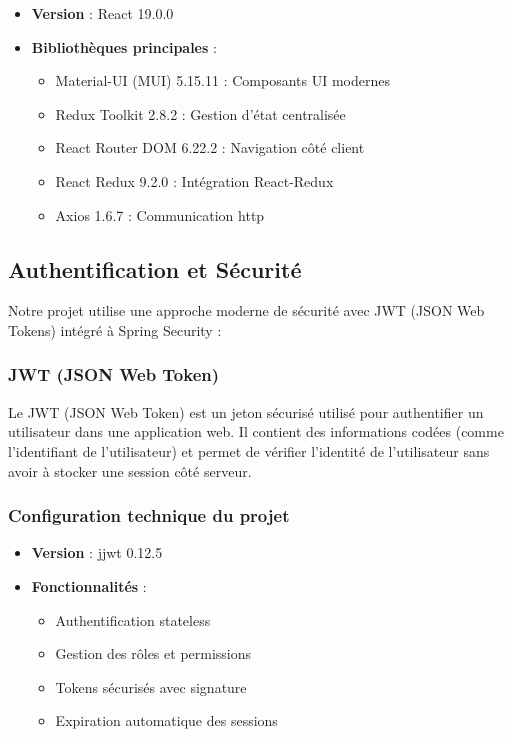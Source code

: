\documentclass[12pt,a4paper]{report}
\begin{document}
\begin{itemize}
\item \textbf{Version} : React 19.0.0
\item \textbf{Bibliothèques principales} :
  \begin{itemize}
  \item Material-UI (MUI) 5.15.11 : Composants UI modernes
  \item Redux Toolkit 2.8.2 : Gestion d'état centralisée
  \item React Router DOM 6.22.2 : Navigation côté client
  \item React Redux 9.2.0 : Intégration React-Redux
  \item Axios 1.6.7 : Communication http
  \end{itemize}
\end{itemize}

\subsection{Authentification et Sécurité}

Notre projet utilise une approche moderne de sécurité avec JWT (JSON Web Tokens) intégré à Spring Security :

\subsubsection{JWT (JSON Web Token)}

Le JWT (JSON Web Token) est un jeton sécurisé utilisé pour authentifier un utilisateur dans une application web. Il contient des informations codées (comme l'identifiant de l'utilisateur) et permet de vérifier l'identité de l'utilisateur sans avoir à stocker une session côté serveur.

\subsubsection{Configuration technique du projet}

\begin{itemize}
\item \textbf{Version} : jjwt 0.12.5
\item \textbf{Fonctionnalités} :
  \begin{itemize}
  \item Authentification stateless
  \item Gestion des rôles et permissions
  \item Tokens sécurisés avec signature
  \item Expiration automatique des sessions
  \end{itemize}
\end{itemize}
\end{document}
